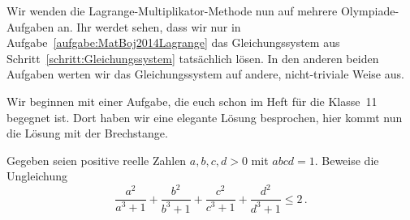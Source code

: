 Wir wenden die Lagrange-Multiplikator-Methode nun auf mehrere Olympiade-Aufgaben an. Ihr werdet sehen, dass wir nur in Aufgabe~\ref{aufgabe:MatBoj2014Lagrange} das Gleichungssystem aus Schritt~\ref{schritt:Gleichungssystem} tatsächlich lösen. In den anderen beiden Aufgaben werten wir das Gleichungssystem auf andere, nicht-triviale Weise aus.

Wir beginnen mit einer Aufgabe, die euch schon im Heft für die Klasse~11 begegnet ist. Dort haben wir eine elegante Lösung besprochen, hier kommt nun die Lösung mit der Brechstange.
\begin{aufgabe*}\label{aufgabe:AIMO2014}
	Gegeben seien positive reelle Zahlen $a,b,c,d>0$ mit $abcd=1$. Beweise die Ungleichung
	\begin{equation*}
		\frac{a^2}{a^3+1}+\frac{b^2}{b^3+1}+\frac{c^2}{c^3+1}+\frac{d^2}{d^3+1}\leqslant 2\,.
	\end{equation*}
\end{aufgabe*}
